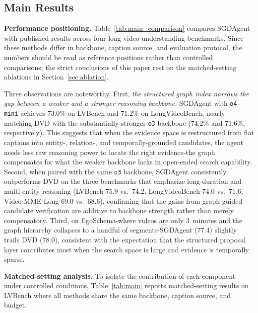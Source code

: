 \documentclass[sigconf, screen, review, anonymous]{acmart}
\begin{document}
\subsection{Main Results}
\label{sec:results}

\textbf{Performance positioning.}
Table~\ref{tab:main_comparison} compares SGDAgent with published results
across four long video understanding benchmarks.  Since these methods
differ in backbone, caption source, and evaluation protocol, the numbers
should be read as reference positions rather than controlled comparisons;
the strict conclusions of this paper rest on the matched-setting ablations
in Section~\ref{sec:ablation}.

Three observations are noteworthy.  First, \emph{the structured graph index
narrows the gap between a weaker and a stronger reasoning backbone.}
SGDAgent with \texttt{o4-mini} achieves 73.0\% on
LVBench\cite{lvbench} and 71.2\% on
LongVideoBench\cite{longvideobench2024}, nearly matching
DVD\cite{deepvideo2025} with the substantially stronger
\texttt{o3} backbone (74.2\% and 71.6\%, respectively).  This suggests
that when the evidence space is restructured from flat captions into
entity-, relation-, and temporally-grounded candidates, the agent needs
less raw reasoning power to locate the right evidence-the graph
compensates for what the weaker backbone lacks in open-ended search
capability.  Second, when paired with the same \texttt{o3} backbone,
SGDAgent consistently outperforms DVD\cite{deepvideo2025} on the three benchmarks that
emphasize long-duration and multi-entity reasoning (LVBench\cite{lvbench} 75.9 vs.\
74.2, LongVideoBench\cite{longvideobench2024} 74.0 vs.\ 71.6, Video-MME Long\cite{videomme2024} 69.0 vs.\ 68.6),
confirming that the gains from graph-guided candidate verification are
additive to backbone strength rather than merely compensatory.  Third,
on EgoSchema\cite{egoschema2023}-where videos are only 3~minutes and the graph hierarchy
collapses to a handful of segments-SGDAgent (77.4) slightly trails DVD\cite{deepvideo2025}
(78.0), consistent with the expectation that the structured proposal
layer contributes most when the search space is large and evidence is
temporally sparse.

\textbf{Matched-setting analysis.}
To isolate the contribution of each component under controlled conditions,
Table~\ref{tab:main} reports matched-setting results on LVBench where all
methods share the same backbone, caption source, and budget.
\end{document}
